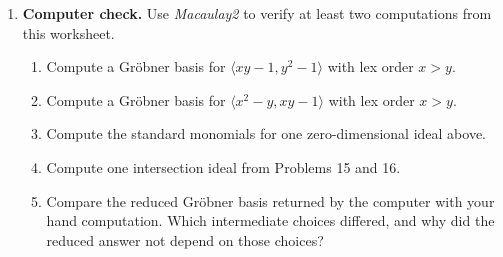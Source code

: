 \documentclass[Notebook.tex]{subfiles}
\begin{document}
\begin{enumerate}[leftmargin=*, resume=problems]
\item \textbf{Computer check.} Use \textit{Macaulay2} to verify at least two computations from this worksheet.
\begin{enumerate}[label=(\alph*),ref=\theenumi\alph*]
    \item Compute a Gr\"obner basis for $\langle xy-1,y^2-1\rangle$ with lex order $x>y$.
    
    \item Compute a Gr\"obner basis for $\langle x^2-y,xy-1\rangle$ with lex order $x>y$.
    
    \item Compute the standard monomials for one zero-dimensional ideal above.
    
    \item Compute one intersection ideal from Problems 15 and 16.
    
    \item Compare the reduced Gr\"obner basis returned by the computer with your hand computation. Which intermediate choices differed, and why did the reduced answer not depend on those choices?
\end{enumerate}

\end{enumerate}
\end{document}
